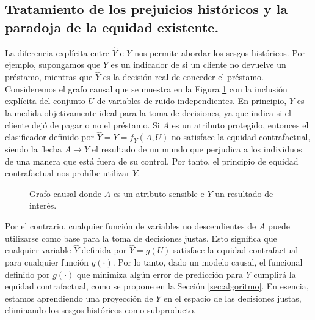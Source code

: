 \documentclass[oneside,openright,titlepage,numbers=noenddot,openany,headinclude,footinclude=true,
cleardoublepage=empty,abstractoff,BCOR=5mm,paper=a4,fontsize=12pt,main=spanish]{scrreprt}
\begin{document}
\subsection*{Tratamiento de los prejuicios históricos y la paradoja de la equidad existente.}

La diferencia explícita entre $\hat{Y}$ e $Y$ nos permite abordar los sesgos históricos. Por ejemplo, supongamos que $Y$ es un indicador de si un cliente no devuelve un préstamo, mientras que $\hat{Y}$ es la decisión real de conceder el préstamo. Consideremos el grafo causal que se muestra en la Figura \ref{fig:grafotratam} con la inclusión explícita del conjunto $U$ de variables de ruido independientes. En principio, $Y$ es la medida objetivamente ideal para la toma de decisiones, ya que indica si el cliente dejó de pagar o no el préstamo. Si $A$ es un atributo protegido, entonces el clasificador definido por $\hat{Y} = Y = f_Y (A, U)$ no satisface la equidad contrafactual, siendo la flecha $A \to Y$ el resultado de un mundo que perjudica a los individuos de una manera que está fuera de su control. Por tanto, el principio de equidad contrafactual nos prohíbe utilizar $Y$.\\

\begin{figure}[h]
\centering
{}
\caption{Grafo causal donde $A$ es un atributo sensible e $Y$ un resultado de interés.}
\label{fig:grafotratam}
\end{figure}

Por el contrario, cualquier función de variables no descendientes de $A$ puede utilizarse como base para la toma de decisiones justas. Esto significa que cualquier variable $\hat{Y}$ definida por $\hat{Y} = g(U)$ satisface la equidad contrafactual para cualquier función $g(\cdot)$. Por lo tanto, dado un modelo causal, el funcional definido por $g(\cdot)$ que minimiza algún error de predicción para $Y$ cumplirá la equidad contrafactual, como se propone en la Sección \ref{sec:algoritmo}. En esencia, estamos aprendiendo una proyección de $Y$ en el espacio de las decisiones justas, eliminando los sesgos históricos como subproducto.
\end{document}
